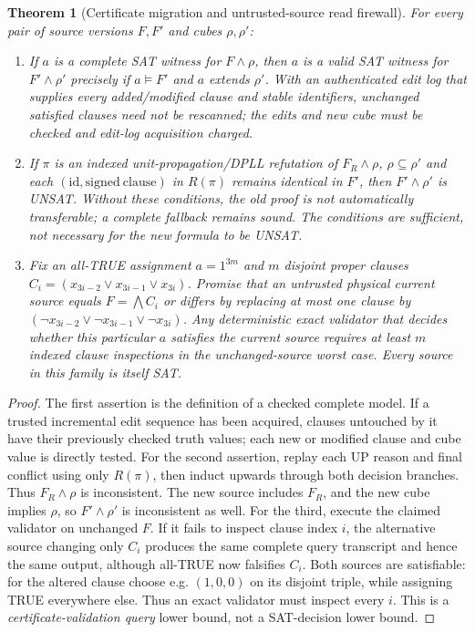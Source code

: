 \documentclass[11pt]{article}
\newtheorem{theorem}{Theorem}
\begin{document}
\begin{theorem}[Certificate migration and untrusted-source read firewall]\label{thm:delta}
For every pair of source versions $F,F'$ and cubes $\rho,\rho'$:
\begin{enumerate}
\item[] If $a$ is a complete SAT witness for $F\wedge\rho$, then $a$ is a valid SAT witness for $F'\wedge\rho'$ precisely if $a\models F'$ and $a$ extends $\rho'$. With an authenticated edit log that supplies every added/modified clause and stable identifiers, unchanged satisfied clauses need not be rescanned; the edits and new cube must be checked and edit-log acquisition charged.
\item[] If $\pi$ is an indexed unit-propagation/DPLL refutation of $F_R\wedge\rho$, $\rho\subseteq\rho'$ and each $(\mathrm{id},\mathrm{signed\ clause})$ in $R(\pi)$ remains identical in $F'$, then $F'\wedge\rho'$ is UNSAT. Without these conditions, the old proof is not automatically transferable; a complete fallback remains sound. The conditions are sufficient, not necessary for the new formula to be UNSAT.
\item[] Fix an all-TRUE assignment $a=1^{3m}$ and $m$ disjoint proper clauses $C_i=(x_{3i-2}\vee x_{3i-1}\vee x_{3i})$. Promise that an untrusted physical current source equals $F=\bigwedge C_i$ or differs by replacing at most one clause by $(\neg x_{3i-2}\vee\neg x_{3i-1}\vee\neg x_{3i})$. Any deterministic exact validator that decides whether \emph{this particular} $a$ satisfies the current source requires at least $m$ indexed clause inspections in the unchanged-source worst case. Every source in this family is itself SAT.
\end{enumerate}
\end{theorem}
\begin{proof}
The first assertion is the definition of a checked complete model. If a trusted incremental edit sequence has been acquired, clauses untouched by it have their previously checked truth values; each new or modified clause and cube value is directly tested. For the second assertion, replay each UP reason and final conflict using only $R(\pi)$, then induct upwards through both decision branches. Thus $F_R\wedge\rho$ is inconsistent. The new source includes $F_R$, and the new cube implies $\rho$, so $F'\wedge\rho'$ is inconsistent as well.
For the third, execute the claimed validator on unchanged $F$. If it fails to inspect clause index $i$, the alternative source changing only $C_i$ produces the same complete query transcript and hence the same output, although all-TRUE now falsifies $C_i$. Both sources are satisfiable: for the altered clause choose e.g. $(1,0,0)$ on its disjoint triple, while assigning TRUE everywhere else. Thus an exact validator must inspect every $i$. This is a \emph{certificate-validation query} lower bound, not a SAT-decision lower bound.\end{proof}
\end{document}
